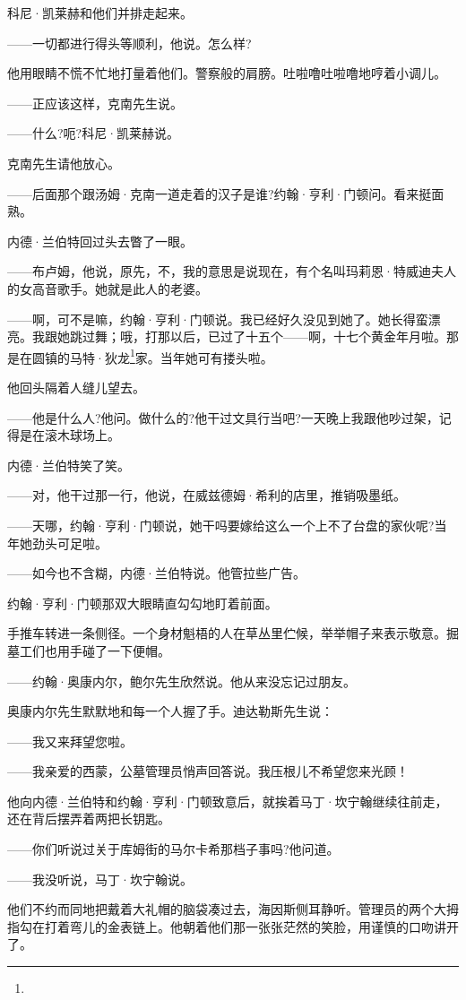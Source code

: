 \par 科尼·凯莱赫和他们并排走起来。
\par ——一切都进行得头等顺利，他说。怎么样?
\par 他用眼睛不慌不忙地打量着他们。警察般的肩膀。吐啦噜吐啦噜地哼着小调儿。
\par ——正应该这样，克南先生说。
\par ——什么?呃?科尼·凯莱赫说。
\par 克南先生请他放心。
\par ——后面那个跟汤姆·克南一道走着的汉子是谁?约翰·亨利·门顿问。看来挺面熟。
\par 内德·兰伯特回过头去瞥了一眼。
\par ——布卢姆，他说，原先，不，我的意思是说现在，有个名叫玛莉恩·特威迪夫人的女高音歌手。她就是此人的老婆。
\par ——啊，可不是嘛，约翰·亨利·门顿说。我已经好久没见到她了。她长得蛮漂亮。我跟她跳过舞；哦，打那以后，已过了十五个——啊，十七个黄金年月啦。那是在圆镇的马特·狄龙\footnote{}家。当年她可有搂头啦。
\par 他回头隔着人缝儿望去。
\par ——他是什么人?他问。做什么的?他干过文具行当吧?一天晚上我跟他吵过架，记得是在滚木球场上。
\par 内德·兰伯特笑了笑。
\par ——对，他干过那一行，他说，在威兹德姆·希利的店里，推销吸墨纸。
\par ——天哪，约翰·亨利·门顿说，她干吗要嫁给这么一个上不了台盘的家伙呢?当年她劲头可足啦。
\par ——如今也不含糊，内德·兰伯特说。他管拉些广告。
\par 约翰·亨利·门顿那双大眼睛直勾勾地盯着前面。
\par 手推车转进一条侧径。一个身材魁梧的人在草丛里伫候，举举帽子来表示敬意。掘墓工们也用手碰了一下便帽。
\par ——约翰·奥康内尔，鲍尔先生欣然说。他从来没忘记过朋友。
\par 奥康内尔先生默默地和每一个人握了手。迪达勒斯先生说：
\par ——我又来拜望您啦。
\par ——我亲爱的西蒙，公墓管理员悄声回答说。我压根儿不希望您来光顾！
\par 他向内德·兰伯特和约翰·亨利·门顿致意后，就挨着马丁·坎宁翰继续往前走，还在背后摆弄着两把长钥匙。
\par ——你们听说过关于库姆街的马尔卡希那档子事吗?他问道。
\par ——我没听说，马丁·坎宁翰说。
\par 他们不约而同地把戴着大礼帽的脑袋凑过去，海因斯侧耳静听。管理员的两个大拇指勾在打着弯儿的金表链上。他朝着他们那一张张茫然的笑脸，用谨慎的口吻讲开了。
